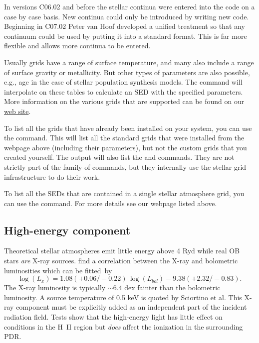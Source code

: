 In versions C06.02 and before the stellar continua were entered into
the code on a case by case basis.
New continua could only be introduced
by writing new code.
Beginning in C07.02 Peter van Hoof developed a unified
treatment so that any continuum could be used by putting
it into a standard format.
This is far more flexible and allows more continua to be entered.

Usually grids have a range of surface temperature, and many also include a
range of surface gravity or metallicity. But other types of parameters are
also possible, e.g., age in the case of stellar population synthesis models.
The  command will interpolate on these tables to
calculate an SED with the specified parameters. More information on the
various grids that are supported can be found on our 
\href{http://gitlab.nublado.org/cloudy/cloudy/-/wikis/StellarAtmospheres}{web site}.

To list all the grids that have already been installed on your system, you can
use the  command. This will list all the
standard grids that were installed from the webpage above (including their
parameters), but not the custom grids that you created yourself.
The output will also list the 
and  commands. They are not strictly part of the
 family of commands, but they internally use the stellar
grid infrastructure to do their work.

To list all the SEDs that are contained in a single stellar atmosphere
grid, you can use the  command. For more
details see our webpage listed above.

\subsection{High-energy component}
\label{sec:StarHighEnergyComponent}

Theoretical stellar atmospheres emit little energy above 4 Ryd while
real OB stars \emph{are} X-ray sources.
\citet{Sciortino1990} find a correlation
between the X-ray and bolometric luminosities which can be fitted~by
\begin{equation}
\log \left( {L_x } \right) = 1.08\left( { + 0.06/ - 0.22} \right)\,\log
\left( {L_{bol} } \right) - 9.38\left( { + 2.32/ - 0.83} \right) .%
\end{equation}
The X-ray luminosity is typically $\sim 6.4$ dex fainter
than the bolometric luminosity.
A source temperature of 0.5 keV is quoted by Sciortino et al.
This X-ray component must be explicitly added as an
independent part of the incident radiation field.
Tests show that the high-energy light has little effect on
conditions in the H~II region but \emph{does} affect the
ionization in the surrounding PDR.

